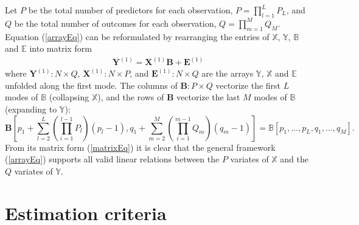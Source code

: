 \documentclass[12pt]{article}
\def\Y{\mathbf{Y}}
\def\X{\mathbf{X}}
\def\XX{\mathbb{X}}
\def\YY{\mathbb{Y}}
\def\E{\mathbf{E}}
\def\EE{\mathbb{E}}
\def\B{\mathbf{B}}
\def\BB{\mathbb{B}}
\def\B{\mathbf{B}}
\begin{document}
Let $P$ be the total number of predictors for each observation,  $P= \prod_{l=1}^L P_L$, and $Q$ be the total number of outcomes for each observation, $Q= \prod_{m=1}^M Q_M$.   Equation (\ref{arrayEq}) can be reformulated by rearranging the entries of $\XX$, $\YY$, $\BB$ and $\EE$ into matrix form
\begin{align}
\Y^{(1)} = \X^{(1)} \B  + \E^{(1)} \label{matrixEq} 	 	
\end{align}
where $\Y^{(1)}: N \times Q$, $\X^{(1)}: N \times P$, and $\E^{(1)}: N \times Q$ are the arrays $\YY$, $\XX$ and $\EE$ unfolded along the first mode.  The columns of $\B: P \times Q$ vectorize the first $L$ modes of $\BB$ (collapsing $\XX$), and the rows of $\B$ vectorize the last $M$ modes of $\BB$ (expanding to $\YY$):
\[\B \left[p_1+ \sum_{l=2}^L \left(\prod_{i=1}^{l-1} P_l \right) (p_l-1), q_1+ \sum_{m=2}^M \left(\prod_{i=1}^{m-1} Q_m \right) (q_m-1)  \right] = \BB[p_1,\hdots,p_L,q_1,\hdots,q_M].\]
From its matrix form (\ref{matrixEq}) it is clear that the general framework (\ref{arrayEq}) supports all valid linear relations between the $P$ variates of $\XX$ and the $Q$ variates of $\YY$.   
      

\section{Estimation criteria}
\label{objective}
\end{document}
